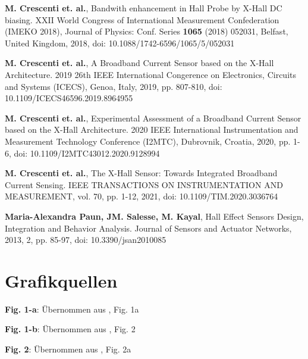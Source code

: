 \documentclass[12pt, a4paper]{article}
\begin{document}
		\newpage
		\begin{thebibliography}{}
			\textbf{M. Crescenti et. al.}, Bandwith enhancement in Hall Probe by X-Hall DC biasing. XXII World Congress of International Measurement Confederation (IMEKO 2018), Journal of Physics: Conf. Series \textbf{1065} (2018) 052031, Belfast, United Kingdom, 2018, doi: 10.1088/1742-6596/1065/5/052031
			
			\textbf{M. Crescenti et. al.}, A  Broadband Current Sensor based on the X-Hall Architecture. 2019 26th IEEE International Congerence on Electronics, Circuits and Systems (ICECS), Genoa, Italy, 2019, pp. 807-810, doi: 10.1109/ICECS46596.2019.8964955
			
			\textbf{M. Crescenti et. al.}, Experimental Assessment of a Broadband Current Sensor based on the X-Hall Architecture. 2020 IEEE International Instrumentation and Measurement Technology Conference (I2MTC), Dubrovnik, Croatia, 2020, pp. 1-6, doi: 10.1109/I2MTC43012.2020.9128994
						
			\textbf{M. Crescenti et. al.}, The X-Hall Sensor: Towards Integrated Broadband Current Sensing. IEEE TRANSACTIONS ON INSTRUMENTATION AND MEASUREMENT, vol. 70, pp. 1-12, 2021, doi: 10.1109/TIM.2020.3036764
			
			\textbf{Maria-Alexandra Paun, JM. Salesse, M. Kayal}, Hall Effect Sensors Design, Integration and Behavior Analysis. Journal of Sensors and Actuator Networks, 2013, 2, pp. 85-97, doi: 10.3390/jsan2010085
			
			
			
		\end{thebibliography}
		
		\section*{Grafikquellen}
		\begin{description}
			\item \textbf{Fig. 1-a}: Übernommen aus \cite{cres18}, Fig. 1a
			\item \textbf{Fig. 1-b}: Übernommen aus \cite{cres20}, Fig. 2
			\item \textbf{Fig. 2}: Übernommen aus \cite{cres18}, Fig. 2a
		\end{description}
		
		
\end{document}
